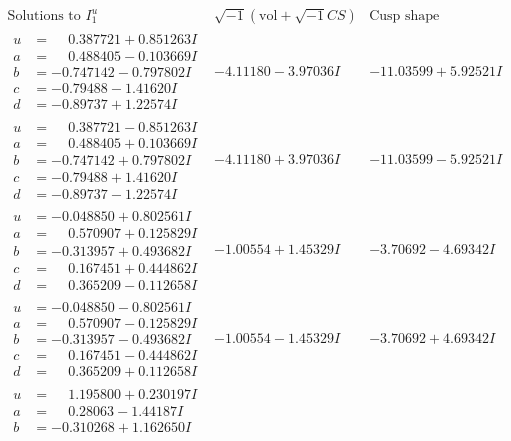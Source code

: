 \documentclass[1p]{elsarticle_modified}
\theoremstyle{definition}
\newcommand{\I}{\sqrt{-1}}
\begin{document}
$$\begin{array}{c|c|c}  
\text{Solutions to }I^u_{1}& \I (\text{vol} + \sqrt{-1}CS) & \text{Cusp shape}\\
 \hline 
\begin{aligned}
u &= \phantom{-}0.387721 + 0.851263 I \\
a &= \phantom{-}0.488405 - 0.103669 I \\
b &= -0.747142 - 0.797802 I \\
c &= -0.79488 - 1.41620 I \\
d &= -0.89737 + 1.22574 I\end{aligned}
 & -4.11180 - 3.97036 I & -11.03599 + 5.92521 I \\ \hline\begin{aligned}
u &= \phantom{-}0.387721 - 0.851263 I \\
a &= \phantom{-}0.488405 + 0.103669 I \\
b &= -0.747142 + 0.797802 I \\
c &= -0.79488 + 1.41620 I \\
d &= -0.89737 - 1.22574 I\end{aligned}
 & -4.11180 + 3.97036 I & -11.03599 - 5.92521 I \\ \hline\begin{aligned}
u &= -0.048850 + 0.802561 I \\
a &= \phantom{-}0.570907 + 0.125829 I \\
b &= -0.313957 + 0.493682 I \\
c &= \phantom{-}0.167451 + 0.444862 I \\
d &= \phantom{-}0.365209 - 0.112658 I\end{aligned}
 & -1.00554 + 1.45329 I & -3.70692 - 4.69342 I \\ \hline\begin{aligned}
u &= -0.048850 - 0.802561 I \\
a &= \phantom{-}0.570907 - 0.125829 I \\
b &= -0.313957 - 0.493682 I \\
c &= \phantom{-}0.167451 - 0.444862 I \\
d &= \phantom{-}0.365209 + 0.112658 I\end{aligned}
 & -1.00554 - 1.45329 I & -3.70692 + 4.69342 I \\ \hline\begin{aligned}
u &= \phantom{-}1.195800 + 0.230197 I \\
a &= \phantom{-}0.28063 - 1.44187 I \\
b &= -0.310268 + 1.162650 I \\

\end{aligned}
\end{array}$$
\end{document}
